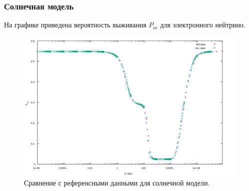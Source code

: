\documentclass[12pt]{article}
\begin{document}




\subsubsection*{Солнечная модель}

На графике приведена вероятность выживания \(P_{\text{ee}}\) для электронного
нейтрино.
\begin{figure}[H]
  \includegraphics[scale=0.6]{sun_our_vs_ref}
  \caption{\label{fig:2}Сравнение с референсными данными для солнечной модели.}
\end{figure}
\end{document}
